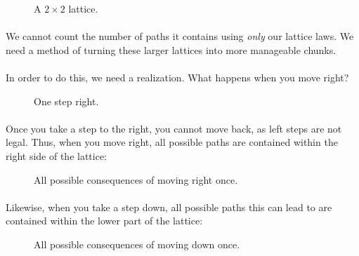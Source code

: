 \documentclass[12pt]{article}
\newcommand{\p}{\paragraph{}}
\begin{document}
			\begin{figure}[h]
				\centering
				
				\caption{A $2 \times 2$ lattice.}
			\end{figure}
		
			\p We cannot count the number of paths it contains using \emph{only} our lattice laws. We need a method of turning these larger lattices into more manageable chunks.
			
			\p In order to do this, we need a realization. What happens when you move right?
			
			\begin{figure}[h]
				\centering
				
				\caption{One step right.}
			\end{figure}
		
			\p Once you take a step to the right, you cannot move back, as left steps are not legal. Thus, when you move right, all possible paths are contained within the right side of the lattice:
			
			\begin{figure}[h]
				\centering
				
				\caption{All possible consequences of moving right once.}
			\end{figure}
		
			\p Likewise, when you take a step down, all possible paths this can lead to are contained within the lower part of the lattice:
			
			\begin{figure}[h]
				\centering
				
				\caption{All possible consequences of moving down once.}
			\end{figure}
		
\end{document}
